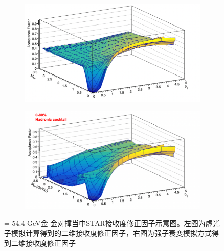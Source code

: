 \begin{figure}[htb]
    \centering
    \begin{subfigure}[b]{0.47\textwidth}
        \centering
        \includegraphics[width=\textwidth,clip]{figures/Chapter4/Accep_VP.png}
        \caption{}
        \label{fig:Accep_VP}
    \end{subfigure}
    \hfill
    \begin{subfigure}[b]{0.47\textwidth}
        \centering
        \includegraphics[width=\textwidth,clip]{figures/Chapter4/Accep_CKT.png}
        \caption{}
        \label{fig:Accep_CKT}
    \end{subfigure}
       \caption[二维STAR接收度修正因子示意图]{\sNN = 54.4 GeV金-金对撞当中STAR接收度修正因子示意图。左图为虚光子模拟计算得到的二维接收度修正因子，右图为强子衰变模拟方式得到二维接收度修正因子}
       \label{fig:TOFEff}
\end{figure}
